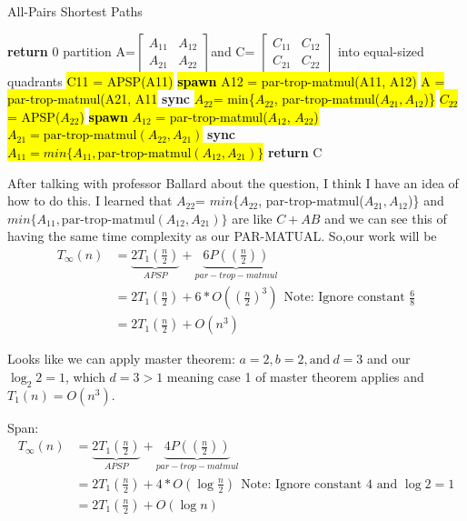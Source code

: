 \documentclass{article}
\newcommand{\hlc}[2][yellow]{ {\sethlcolor{#1} \hl{#2}} }
\begin{document}
\algrenewcommand\textproc{}
\begin{algorithm}
\renewcommand{\thealgorithm}{3:}
\caption{All-Pairs Shortest Paths}
\begin{algorithmic}[1]
\State \textbf{return} 0
\EndIf 
\State partition A=$\left[ \begin{array}{ll}{A_{11}} & {A_{12}} \\ {A_{21}} & {A_{22}}\end{array}\right]$and C= $\left[ \begin{array}{ll}{C_{11}} & {C_{12}}\\ {C_{21}} & {C_{22}}\end{array}\right]$
into equal-sized quadrants
\State \hlc[red]{C11 = APSP(A11)}
\State \hl{\textbf{spawn} A12 = par-trop-matmul(A11, A12)}
\State \hl{A = par-trop-matmul(A21, A11}
\State \textbf{sync}
\State \hl{$A_{22}$= min\{$A_{22}$, par-trop-matmul($A_{21}, A_{12}$)\} }
\State \hlc[red]{$C_{22}$ = APSP($A_{22}$)}
\State \hl{\textbf{spawn} $A_{12}$ = par-trop-matmul($A_{12}$, $A_{22}$)}
\State \hl{$A_{21} = \text{par-trop-matmul}(A_{22}, A_{21})$}
\State \textbf{sync}
\State \hl{$A_{11} = min\{A_{11},\text{par-trop-matmul} (A_{12}, A_{21})\}$}
\State \textbf{return} C
\EndFunction
\end{algorithmic}
\end{algorithm}

After talking with professor Ballard about the question, I think I have an idea of how to do this. I learned that  $A_{22}$= $min$\{$A_{22}$, par-trop-matmul($A_{21}, A_{12}$)\} and $min\{A_{11},\text{par-trop-matmul} (A_{12}, A_{21})\}$
are like $C+AB$ and we can see this of having the same time complexity as our PAR-MATUAL. So,our work will be
\begin{equation*}
\begin{split}
  T_{\infty}(n)&=\underbrace{2T_1(\frac{n}{2})}_{APSP}+\underbrace{6P((\frac{n}{2}))}_{par-trop-matmul}\\
  &=2T_1(\frac{n}{2})+6*O((\frac{n}{2})^3) \ \  \text{Note: Ignore constant $\frac{6}{8}$}\\
  &=2T_1(\frac{n}{2})+O(n^3) \end{split}\end{equation*}
  

Looks like we can apply master theorem: $a=2, b=2,\text{and}\ d=3$ and our $\log_{2}2 =1$, which $d=3>1$ meaning case 1 of master theorem applies and $ T_{1}(n)=O(n^3).$ 

Span: \begin{equation*}
\begin{split}
  T_{\infty}(n)&=\underbrace{2T_1(\frac{n}{2})}_{APSP}+\underbrace{4P((\frac{n}{2}))}_{par-trop-matmul}\\
  &=2T_1(\frac{n}{2})+4*O(\log\frac{n}{2}) \ \  \text{Note: Ignore constant $4$ and $\log2=1$}\\
  &=2T_1(\frac{n}{2})+O(\log n) \end{split}\end{equation*}
  
\end{document}

